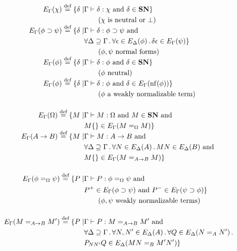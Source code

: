 

\newcommand{\ldot}{\, . \,}
\begin{definition}
\label{df:computable}
\begin{align*}
E_\Gamma(\chi) \eqdef \{ \delta \mid & \Gamma \vdash \delta : \chi\text{ and } \delta \in \SN \} \\
& \qquad (\chi \text{ is neutral or } \bot) \\
E_\Gamma(\phi \supset \psi) \eqdef \{ \delta \mid & \Gamma \vdash \delta : \phi \supset \psi\text{ and } \\
& \forall \Delta \supseteq \Gamma \ldot \forall \epsilon \in E_\Delta(\phi)\ldot \delta \epsilon \in E_\Gamma(\psi) \} \\
& \qquad (\phi , \psi \text{ normal forms}) \\
E_\Gamma(\phi) \eqdef \{ \delta \mid & \Gamma \vdash \delta : \phi\text{ and } \delta \in \SN \} \\
& \qquad (\phi \text{ neutral}) \\
E_\Gamma(\phi) \eqdef \{ \delta \mid & \Gamma \vdash \delta : \phi\text{ and } \delta \in E_\Gamma(\nf{\phi}) \} \\
& \qquad (\phi \text{ a weakly normalizable term}) \\
\\
E_\Gamma(\Omega) \eqdef \{ M \mid & \Gamma \vdash M : \Omega\text{ and } M \in \SN\text{ and } \\
& M \{\} \in E_\Gamma(M =_\Omega M) \} \\
E_\Gamma(A \rightarrow B) \eqdef \{ M \mid & \Gamma \vdash M : A \rightarrow B\text{ and } \\
& \forall \Delta \supseteq \Gamma\ldot \forall N \in E_\Delta(A)\ldot MN \in E_\Delta(B)\text{ and } \\
& M \{\} \in E_\Gamma(M =_{A \rightarrow B} M) \} \\
\\
E_\Gamma(\phi =_\Omega \psi) \eqdef \{ P \mid & \Gamma \vdash P : \phi =_\Omega \psi\text{ and } \\
& P^+ \in E_\Gamma(\phi \supset \psi)\text{ and } P^- \in E_\Gamma(\psi \supset \phi) \} \\
& \qquad (\phi , \psi \text{ weakly normalizable terms}) \\
\\
E_\Gamma(M =_{A \rightarrow B} M') \eqdef \{ P \mid & \Gamma \vdash P : M =_{A \rightarrow B} M'\text{ and } \\
& \forall \Delta \supseteq \Gamma\ldot \forall N, N' \in E_\Delta(A)\ldot \forall Q \in E_\Delta(N =_A N')\ldot \\
& P_{NN'}Q \in E_\Delta(MN =_B M'N') \}
\end{align*}
\end{definition}

